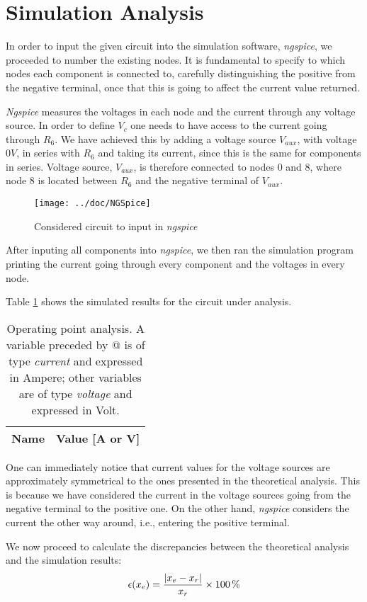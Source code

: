 \section{Simulation Analysis}
\label{sec:simulation}


In order to input the given circuit into the simulation software, \emph{ngspice}, we proceeded to number the existing nodes. It is fundamental to specify to which nodes each component is connected to, carefully distinguishing the positive from the negative terminal, once that this is going to affect the current value returned.

\emph{Ngspice} measures the voltages in each node and the current through any voltage source. In order to define $V_c$ one needs to have access to the current going through $R_6$. We have achieved this by adding a voltage source $V_{aux}$, with voltage $0V$, in series with $R_6$ and taking its current, since this is the same for components in series. Voltage source, $V_{aux}$, is therefore connected to nodes 0 and 8, where node 8 is located between $R_6$ and the negative terminal of $V_{aux}$.

\begin{figure}[H]
  \centering
  \texttt{[image: ../doc/NGSpice]}
  \caption{Considered circuit to input in \emph{ngspice}}
  \label{fig:fignodos}
\end{figure}

After inputing all components into \emph{ngspice}, we then ran the simulation program printing the current going through every component and the voltages in every node.


Table \ref{tab:ngspice} shows the simulated results for the circuit
under analysis.

\begin{table}[H]
  \centering
  \begin{tabular}{|l|r|}
    \hline
    {\bf Name} & {\bf Value [A or V]} \\ \hline
    
  \end{tabular}
  \caption{Operating point analysis. A variable preceded by @ is of type {\em current}
    and expressed in Ampere; other variables are of type {\it voltage} and expressed in
    Volt.}
  \label{tab:ngspice}
\end{table}

One can immediately notice that current values for the voltage sources are approximately symmetrical to the ones presented in the theoretical analysis. This is because we have considered the current in the voltage sources going from the negative terminal to the positive one. On the other hand, \emph{ngspice} considers the current the other way around, i.e., entering the positive terminal.
\par
We now proceed to calculate the discrepancies between the theoretical analysis and the simulation results:
\begin{equation}
  \centering
  \epsilon (x_e)=\frac{|x_e-x_r|}{x_r} \times 100\,\%
  \label{eq:error}
\end{equation}

